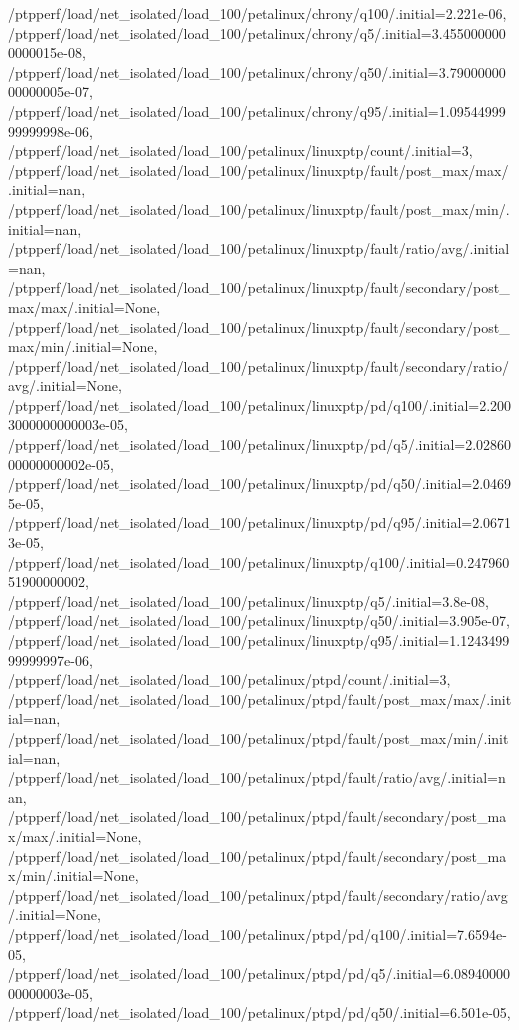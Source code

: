 {    /ptpperf/load/net_isolated/load_100/petalinux/chrony/q100/.initial=2.221e-06,
    /ptpperf/load/net_isolated/load_100/petalinux/chrony/q5/.initial=3.4550000000000015e-08,
    /ptpperf/load/net_isolated/load_100/petalinux/chrony/q50/.initial=3.7900000000000005e-07,
    /ptpperf/load/net_isolated/load_100/petalinux/chrony/q95/.initial=1.0954499999999998e-06,
    /ptpperf/load/net_isolated/load_100/petalinux/linuxptp/count/.initial=3,
    /ptpperf/load/net_isolated/load_100/petalinux/linuxptp/fault/post_max/max/.initial=nan,
    /ptpperf/load/net_isolated/load_100/petalinux/linuxptp/fault/post_max/min/.initial=nan,
    /ptpperf/load/net_isolated/load_100/petalinux/linuxptp/fault/ratio/avg/.initial=nan,
    /ptpperf/load/net_isolated/load_100/petalinux/linuxptp/fault/secondary/post_max/max/.initial=None,
    /ptpperf/load/net_isolated/load_100/petalinux/linuxptp/fault/secondary/post_max/min/.initial=None,
    /ptpperf/load/net_isolated/load_100/petalinux/linuxptp/fault/secondary/ratio/avg/.initial=None,
    /ptpperf/load/net_isolated/load_100/petalinux/linuxptp/pd/q100/.initial=2.2003000000000003e-05,
    /ptpperf/load/net_isolated/load_100/petalinux/linuxptp/pd/q5/.initial=2.0286000000000002e-05,
    /ptpperf/load/net_isolated/load_100/petalinux/linuxptp/pd/q50/.initial=2.04695e-05,
    /ptpperf/load/net_isolated/load_100/petalinux/linuxptp/pd/q95/.initial=2.06713e-05,
    /ptpperf/load/net_isolated/load_100/petalinux/linuxptp/q100/.initial=0.24796051900000002,
    /ptpperf/load/net_isolated/load_100/petalinux/linuxptp/q5/.initial=3.8e-08,
    /ptpperf/load/net_isolated/load_100/petalinux/linuxptp/q50/.initial=3.905e-07,
    /ptpperf/load/net_isolated/load_100/petalinux/linuxptp/q95/.initial=1.124349999999997e-06,
    /ptpperf/load/net_isolated/load_100/petalinux/ptpd/count/.initial=3,
    /ptpperf/load/net_isolated/load_100/petalinux/ptpd/fault/post_max/max/.initial=nan,
    /ptpperf/load/net_isolated/load_100/petalinux/ptpd/fault/post_max/min/.initial=nan,
    /ptpperf/load/net_isolated/load_100/petalinux/ptpd/fault/ratio/avg/.initial=nan,
    /ptpperf/load/net_isolated/load_100/petalinux/ptpd/fault/secondary/post_max/max/.initial=None,
    /ptpperf/load/net_isolated/load_100/petalinux/ptpd/fault/secondary/post_max/min/.initial=None,
    /ptpperf/load/net_isolated/load_100/petalinux/ptpd/fault/secondary/ratio/avg/.initial=None,
    /ptpperf/load/net_isolated/load_100/petalinux/ptpd/pd/q100/.initial=7.6594e-05,
    /ptpperf/load/net_isolated/load_100/petalinux/ptpd/pd/q5/.initial=6.0894000000000003e-05,
    /ptpperf/load/net_isolated/load_100/petalinux/ptpd/pd/q50/.initial=6.501e-05,
}
